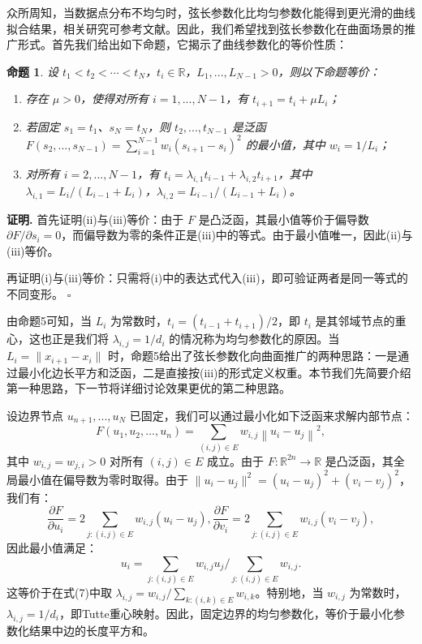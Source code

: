 \documentclass{ctexart}
\newtheorem{proposition}{命题}
\theoremstyle{proof}
\newenvironment{proof}{\noindent\textbf{证明.}}{\hfill$\square$\par}
\begin{document}
众所周知，当数据点分布不均匀时，弦长参数化比均匀参数化能得到更光滑的曲线拟合结果，相关研究可参考文献\cite{foley1992}。因此，我们希望找到弦长参数化在曲面场景的推广形式。首先我们给出如下命题，它揭示了曲线参数化的等价性质：

\begin{proposition}
设 $t_1<t_2<\cdots<t_N$，$t_i \in \mathbb{R}$，$L_1,...,L_{N-1}>0$，则以下命题等价：
\begin{enumerate}
    \item 存在 $\mu>0$，使得对所有 $i=1,...,N-1$，有 $t_{i+1}=t_i+\mu L_i$；
    \item 若固定 $s_1=t_1$、$s_N=t_N$，则 $t_2,...,t_{N-1}$ 是泛函 $F(s_2,...,s_{N-1})=\sum_{i=1}^{N-1} w_i(s_{i+1}-s_i)^2$ 的最小值，其中 $w_i=1/L_i$；
    \item 对所有 $i=2,...,N-1$，有 $t_i=\lambda_{i,1}t_{i-1}+\lambda_{i,2}t_{i+1}$，其中 $\lambda_{i,1}=L_i/(L_{i-1}+L_i)$，$\lambda_{i,2}=L_{i-1}/(L_{i-1}+L_i)$。
\end{enumerate}
\end{proposition}

\begin{proof}
首先证明(ii)与(iii)等价：由于 $F$ 是凸泛函，其最小值等价于偏导数 $\partial F/\partial s_i=0$，而偏导数为零的条件正是(iii)中的等式。由于最小值唯一，因此(ii)与(iii)等价。

再证明(i)与(iii)等价：只需将(i)中的表达式代入(iii)，即可验证两者是同一等式的不同变形。
\end{proof}

由命题5可知，当 $L_i$ 为常数时，$t_i=(t_{i-1}+t_{i+1})/2$，即 $t_i$ 是其邻域节点的重心，这也正是我们将 $\lambda_{i,j}=1/d_i$ 的情况称为均匀参数化的原因。当 $L_i=\|x_{i+1}-x_i\|$ 时，命题5给出了弦长参数化向曲面推广的两种思路：一是通过最小化边长平方和泛函，二是直接按(iii)的形式定义权重。本节我们先简要介绍第一种思路，下一节将详细讨论效果更优的第二种思路。

设边界节点 $u_{n+1},...,u_N$ 已固定，我们可以通过最小化如下泛函来求解内部节点：
\[
F\left(u_{1}, u_{2}, ..., u_{n}\right)=\sum_{(i, j) \in E} w_{i, j}\left\| u_{i}-u_{j}\right\| ^{2},
\]
其中 $w_{i,j}=w_{j,i}>0$ 对所有 $(i,j) \in E$ 成立。由于 $F: \mathbb{R}^{2n} \to \mathbb{R}$ 是凸泛函，其全局最小值在偏导数为零时取得。由于 $\|u_i-u_j\|^2=(u_i-u_j)^2+(v_i-v_j)^2$，我们有：
\[
\frac{\partial F}{\partial u_{i}}=2 \sum_{j:(i, j) \in E} w_{i, j}\left(u_{i}-u_{j}\right), \frac{\partial F}{\partial v_{i}}=2 \sum_{j:(i, j) \in E} w_{i, j}\left(v_{i}-v_{j}\right),
\]
因此最小值满足：
\[
u_{i}=\sum_{j:(i, j) \in E} w_{i, j} u_{j} / \sum_{j:(i, j) \in E} w_{i, j}.
\]
这等价于在式(7)中取 $\lambda_{i,j}=w_{i,j}/\sum_{k:(i,k) \in E} w_{i,k}$。特别地，当 $w_{i,j}$ 为常数时，$\lambda_{i,j}=1/d_i$，即Tutte重心映射。因此，固定边界的均匀参数化，等价于最小化参数化结果中边的长度平方和。
\end{document}
